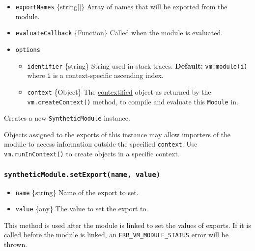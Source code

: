 \begin{itemize}
\tightlist
\item
  \texttt{exportNames} \{string{[}{]}\} Array of names that will be
  exported from the module.
\item
  \texttt{evaluateCallback} \{Function\} Called when the module is
  evaluated.
\item
  \texttt{options}

  \begin{itemize}
  \tightlist
  \item
    \texttt{identifier} \{string\} String used in stack traces.
    \textbf{Default:}
    \texttt{\textquotesingle{}vm:module(i)\textquotesingle{}} where
    \texttt{i} is a context-specific ascending index.
  \item
    \texttt{context} \{Object\} The
    \hyperref[what-does-it-mean-to-contextify-an-object]{contextified}
    object as returned by the \texttt{vm.createContext()} method, to
    compile and evaluate this \texttt{Module} in.
  \end{itemize}
\end{itemize}

Creates a new \texttt{SyntheticModule} instance.

Objects assigned to the exports of this instance may allow importers of
the module to access information outside the specified \texttt{context}.
Use \texttt{vm.runInContext()} to create objects in a specific context.

\subsubsection{\texorpdfstring{\texttt{syntheticModule.setExport(name,\ value)}}{syntheticModule.setExport(name, value)}}\label{syntheticmodule.setexportname-value}

\begin{itemize}
\tightlist
\item
  \texttt{name} \{string\} Name of the export to set.
\item
  \texttt{value} \{any\} The value to set the export to.
\end{itemize}

This method is used after the module is linked to set the values of
exports. If it is called before the module is linked, an
\href{errors.md\#err_vm_module_status}{\texttt{ERR\_VM\_MODULE\_STATUS}}
error will be thrown.

